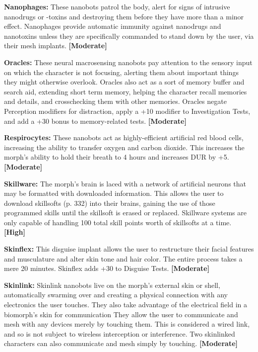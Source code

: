 \textbf{Nanophages:} These nanobots patrol the body, alert 
for signs of intrusive nanodrugs or -toxins and destroying
them before they have more than a minor
effect. Nanophages provide automatic immunity 
against nanodrugs and nanotoxins unless they are 
specifically commanded to stand down by the user, via 
their mesh implants. \textbf{[Moderate]}

\textbf{Oracles: }These neural macrosensing nanobots pay 
attention to the sensory input on which the character
is not focusing, alerting them about important
things they might otherwise overlook. Oracles also 
act as a sort of memory buffer and search aid, extending
short term memory, helping the character
recall memories and details, and crosschecking 
them with other memories. Oracles negate Perception
modifiers for distraction, apply a +10 modifier
to Investigation Tests, and add a +30 bonus to
memory-related tests. \textbf{[Moderate]}

\textbf{Respirocytes:} These nanobots act as highly-efficient 
artificial red blood cells, increasing the ability to 
transfer oxygen and carbon dioxide. This increases 
the morph's ability to hold their breath to 4 hours 
and increases DUR by +5. \textbf{[Moderate]}

\textbf{Skillware: }The morph's brain is laced with a network
of artificial neurons that may be formatted with
downloaded information. This allows the user to 
download skillsofts (p. 332) into their brains, gaining 
the use of those programmed skills until the skillsoft 
is erased or replaced. Skillware systems are only 
capable of handling 100 total skill points worth of 
skillsofts at a time. \textbf{[High]}

\textbf{Skinflex: }This disguise implant allows the user to 
restructure their facial features and musculature and 
alter skin tone and hair color. The entire process takes 
a mere 20 minutes. Skinflex adds +30 to Disguise 
Tests. \textbf{[Moderate]}

\textbf{Skinlink:} Skinlink nanobots live on the morph's 
external skin or shell, automatically swarming over 
and creating a physical connection with any electronics
the user touches. They also take advantage of the
electrical field in a biomorph's skin for communication
They allow the user to communicate and mesh
with any devices merely by touching them. This 
is considered a wired link, and so is not subject to 
wireless interception or interference. Two skinlinked 
characters can also communicate and mesh simply by 
touching. \textbf{[Moderate]}

